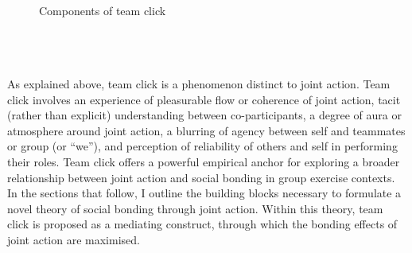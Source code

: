 \begin{CJK}{UTF8}{gbsn}
        \begin{figure}
          \noindent{}
              \\
          \caption{Components of team click}
          \label{fig:clickComponents}
        \end{figure}


    \\
    \\
    \\
    As explained above, team click is a phenomenon distinct to joint action.  Team click involves an experience of pleasurable flow or coherence of joint action, tacit (rather than explicit) understanding between co-participants, a degree of aura or atmosphere around joint action, a blurring of agency between self and teammates or group (or ``we''), and perception of reliability of others and self in performing their roles.  Team click offers a powerful empirical anchor for exploring a broader relationship between joint action and social bonding in group exercise contexts.  In the sections that follow, I outline the building blocks necessary to formulate a novel theory of social bonding through joint action.  Within this theory, team click is proposed as a mediating construct, through which the bonding effects of joint action are maximised.





\end{CJK}
